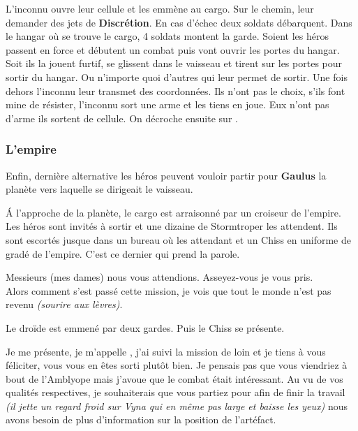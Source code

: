 L’inconnu ouvre leur cellule et les emmène au cargo. Sur le chemin, leur demander des jets de \textbf{Discrétion}. En cas d’échec deux soldats débarquent. Dans le hangar où se trouve le cargo, 4 soldats montent la garde. Soient les héros passent en force et débutent un combat puis vont ouvrir les portes du hangar. Soit ils la jouent furtif, se glissent dans le vaisseau et tirent sur les portes pour sortir du hangar. Ou n’importe quoi d’autres qui leur permet de sortir. Une fois dehors l’inconnu leur transmet des coordonnées. Ils n’ont pas le choix, s’ils font mine de résister, l’inconnu sort une arme et les tiens en joue. Eux n’ont pas d’arme ils sortent de cellule. On décroche ensuite sur .



\subsubsection{L’empire} \label{sec:l-empire}
Enfin, dernière alternative les héros peuvent vouloir partir pour \textbf{Gaulus} la planète vers laquelle se dirigeait le vaisseau. 

\'A l’approche de la planète, le cargo est arraisonné par un croiseur de l’empire. Les héros sont invités à sortir et une dizaine de Stormtroper les attendent. Ils sont escortés jusque dans un bureau où les attendant  et un Chiss en uniforme de gradé de l’empire. C’est ce dernier qui prend la parole.

\begin{quotebox}
    Messieurs (mes dames) nous vous attendions. Asseyez-vous je vous pris. \\
    Alors comment s’est passé cette mission, je vois que tout le monde n’est pas revenu \emph{(sourire aux lèvres)}. 
\end{quotebox}

Le droïde est emmené par deux gardes. Puis le Chiss se présente.

\begin{quotebox}
    Je me présente, je m’appelle , j’ai suivi la mission de loin et je tiens à vous féliciter, vous vous en êtes sorti plutôt bien. Je pensais pas que vous viendriez à bout de l’Amblyope mais j’avoue que le combat était intéressant. Au vu de vos qualités respectives, je souhaiterais que vous partiez pour  afin de finir la travail \emph{(il jette un regard froid sur Vyna qui en même pas large et baisse les yeux)} nous avons besoin de plus d’information sur la position de l’artéfact.
\end{quotebox}


